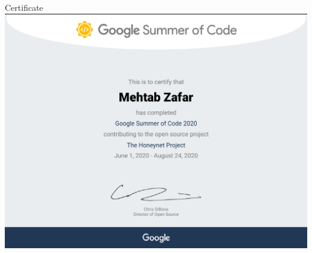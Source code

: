 \newpage
\thispagestyle{empty}

\begin{center}
{\LARGE Certificate}\\[1.5cm]
\includegraphics[scale=0.6,center]{cert}
\end{center}

\vfill


